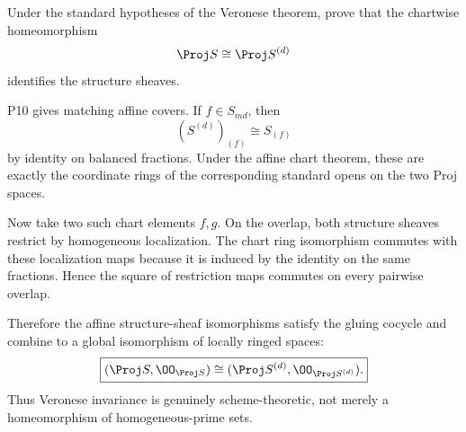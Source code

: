 \begin{problem}\label{prob:vi35-16}
Under the standard hypotheses of the Veronese theorem, prove that the chartwise homeomorphism
\[
\Proj S\cong\Proj S^{(d)}
\]
identifies the structure sheaves.

\end{problem}

\ifdefined\FullProblemDossiers
\begin{solution}
P10 gives matching affine covers. If \(f\in S_{md}\), then
\[
(S^{(d)})_{(f)}
\cong
S_{(f)}
\]
by identity on balanced fractions. Under the affine chart theorem, these are exactly the coordinate rings of the
corresponding standard opens on the two Proj spaces.

Now take two such chart elements \(f,g\). On the overlap, both structure sheaves restrict by homogeneous
localization. The chart ring isomorphism commutes with these localization maps because it is induced by the identity
on the same fractions. Hence the square of restriction maps commutes on every pairwise overlap.

Therefore the affine structure-sheaf isomorphisms satisfy the gluing cocycle and combine to a global isomorphism of
locally ringed spaces:
\[
\boxed{
(\Proj S,\OO_{\Proj S})
\cong
(\Proj S^{(d)},\OO_{\Proj S^{(d)}}).
}
\]
Thus Veronese invariance is genuinely scheme-theoretic, not merely a homeomorphism of homogeneous-prime sets.
\end{solution}
\fi
